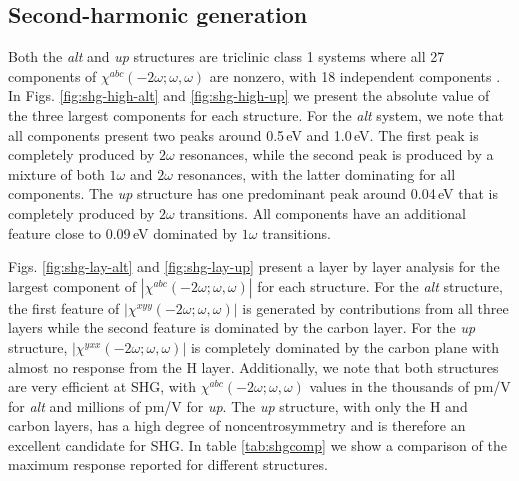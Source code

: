 \documentclass[pss]{wiley2sp} %
\begin{document}
\subsection{Second-harmonic generation}

Both the \emph{alt} and \emph{up} structures are triclinic class 1 systems
where all 27 components of $\chi^{abc}(-2\omega;\omega,\omega)$ are nonzero,
with 18 independent components \cite{popovbook}. In Figs. 
\ref{fig:shg-high-alt} and \ref{fig:shg-high-up} we present the absolute value
of the three largest components for each structure. For the \emph{alt} system,
we note that all components present two peaks around 0.5\,eV and 1.0\,eV. The
first peak is completely produced by $2\omega$ resonances, while the second
peak is produced by a mixture of both $1\omega$ and $2\omega$ resonances, with
the latter dominating for all components. The \emph{up} structure  has one
predominant peak around 0.04\,eV that is completely produced by $2\omega$
transitions. All components have an additional feature close to 0.09\,eV
dominated by $1\omega$ transitions.

Figs. \ref{fig:shg-lay-alt} and \ref{fig:shg-lay-up} present a layer by layer
analysis for the largest component of $|\chi^{abc}(-2\omega;\omega,\omega)|$
for each structure. For the \emph{alt} structure, the first feature of
$|\chi^{xyy}(-2\omega;\omega,\omega)|$ is generated by contributions from all
three layers while the second feature is dominated by the carbon layer. For the
\emph{up} structure, $|\chi^{yxx}(-2\omega;\omega,\omega)|$ is completely
dominated by the carbon plane with almost no response from the H layer.
Additionally, we note that both structures are very efficient at SHG, with
$\chi^{abc}(-2\omega;\omega,\omega)$ values in the thousands of pm/V for
\emph{alt} and millions of pm/V for \emph{up}. The \emph{up} structure, with
only the H and carbon layers, has a high degree of noncentrosymmetry and is
therefore an excellent candidate for SHG. In table \ref{tab:shgcomp} we show a
comparison of the maximum response reported for different structures.
\end{document}
